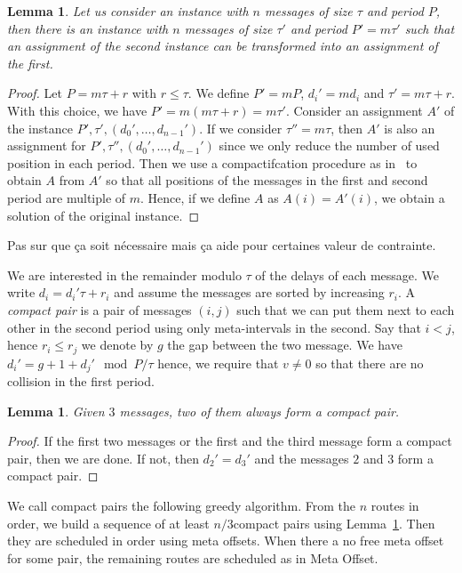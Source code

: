 \documentclass[10pt, conference, letterpaper]{IEEEtran}
\newtheorem{lemma}[theorem]{Lemma}
\begin{document}
\begin{lemma}
Let us consider an instance with $n$ messages of size $\tau$ and period $P$,
then there is an instance with $n$ messages of size $\tau'$ and period $P'= m\tau'$ such that an assignment of the second instance can be transformed into an assignment of the first.
\end{lemma}
\begin{proof}
Let $P = m \tau + r$ with $r \leq \tau$. We define $P' = mP$, $d_{i}' = m d_i$ 
and $\tau' = m \tau + r$. With this choice, we have $P' = m(m \tau + r) = m \tau'$.
Consider an assignment $A'$ of the instance $P',\tau',(d_{0}',\dots,d_{n-1}')$.
If we consider $\tau'' = m\tau$, then $A'$ is also an assignment for $P',\tau'',(d_{0}',\dots,d_{n-1}')$ since we only reduce the number of used position in each period. 
Then we use a compactifcation procedure as in~\cite{barth2018deterministic} to obtain $A$ from $A'$ so that all positions of the messages in the first and second period
are multiple of $m$. Hence, if we define $A$ as $A(i) = A'(i)$, we obtain a solution of the 
original instance.
\end{proof}
Pas sur que ça soit nécessaire mais ça aide pour certaines valeur de contrainte.

We are interested in the remainder modulo $\tau$ of the delays of each message.
We write $d_i = d_{i}'\tau + r_i$ and assume the messages are sorted by increasing $r_i$.
A \emph{compact pair} is a pair of messages $(i,j)$ such that we can put them
next to each other in the second period using only meta-intervals in the second.
Say that $i < j$, hence $r_i \leq r_j$ we denote by $g$ the gap between the two message.
We have $d_{i}' = g + 1 + d_{j}' \mod P/\tau$ hence, we require that $v \neq 0$ so that
there are no collision in the first period. 

\begin{lemma}\label{lemma:pair_find}
Given $3$ messages, two of them always form a compact pair. 
\end{lemma}
\begin{proof}

If the first two messages or the first and the third message form a compact pair,
then we are done. If not, then $d_{2}' = d_{3}'$ and the messages $2$ and $3$
form a compact pair.
\end{proof}

We call compact pairs the following greedy algorithm. From the $n$ routes in order,
we build a sequence of at least $n/3 $compact pairs using Lemma~\ref{lemma:pair_find}. Then they are scheduled in order using meta offsets. When there a no free meta offset for some pair, the remaining routes are scheduled as in Meta Offset.
\end{document}
